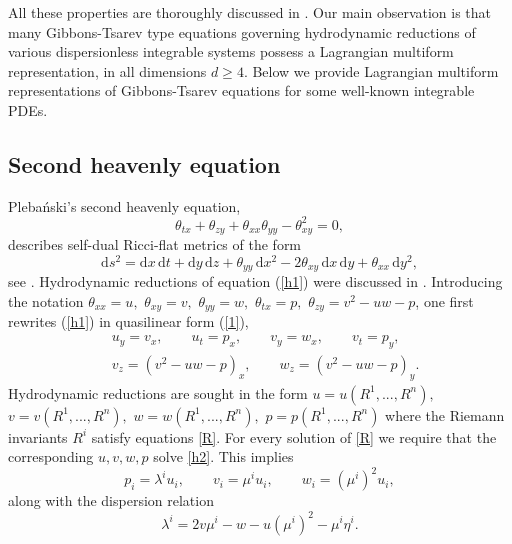 \documentclass[12pt, a4paper]{article}
\theoremstyle{definition}
\renewcommand{\d}{\mathrm{d}}
\begin{document}
All these properties are thoroughly discussed in \cite{ferapontov2004integrability, ferapontov2004hydrodynamic, ferapontov2014dispersionless, berjawi2020secondorder, berjawi2022secondorder}. Our main observation is that many Gibbons-Tsarev type equations governing hydrodynamic reductions of various dispersionless integrable systems  possess a Lagrangian multiform representation, in all dimensions $d\geq 4$. Below we provide Lagrangian multiform representations of Gibbons-Tsarev equations 
for some well-known integrable PDEs.


\subsection{Second heavenly equation}

Pleba\'nski's second heavenly equation,
\begin{equation}
\theta_{tx}+\theta_{zy}+\theta_{xx}\theta_{yy}-\theta^2_{xy}=0,
\label{h1}
\end{equation}
describes self-dual Ricci-flat metrics of the form
$$
\d s^2 = \d x \, \d t + \d y \, \d z + \theta_{yy} \, \d x^2-2\theta_{xy} \, \d x \, \d y + \theta_{xx} \, \d y^2,
$$
see \cite{plebanski1975solutions}. Hydrodynamic reductions of equation (\ref{h1}) were discussed in  \cite{ferapontov2004integrability}. Introducing the notation $\theta_{xx}=u, $ $ \theta_{xy}=v, $ $ \theta_{yy}=w, $ $ \theta_{tx}=p, $ $ \theta_{zy}=v^2-uw-p$, one first rewrites 
(\ref{h1}) in quasilinear form (\ref{1}),
\begin{equation}
\begin{split}
&u_y=v_x, \qquad u_t=p_x, \qquad v_y=w_x, \qquad v_t=p_y, \\
&v_z=(v^2-uw-p)_x, \qquad w_z=(v^2-uw-p)_y.
\end{split}
\label{h2}
\end{equation}
Hydrodynamic reductions are sought in the form $u=u(R^1, ..., R^n),$ $v=v(R^1, ..., R^n),$ $w=w(R^1, ..., R^n),$ $p=p(R^1, ..., R^n)$  where the Riemann invariants $R^i$ satisfy equations \eqref{R}. For every solution of \eqref{R} we require that the corresponding $u,v,w,p$ solve \eqref{h2}. This implies 
\begin{equation}
 p_i=\lambda^i u_i, \qquad  v_i=\mu^i u_i, \qquad w_i=(\mu^i)^2 u_i,
\label{h4}
\end{equation}
along with the dispersion relation
\begin{equation}
\lambda^i=2v\mu^i-w-u(\mu^i)^2-\mu^i\eta^i.
\label{h5}
\end{equation}
\end{document}
